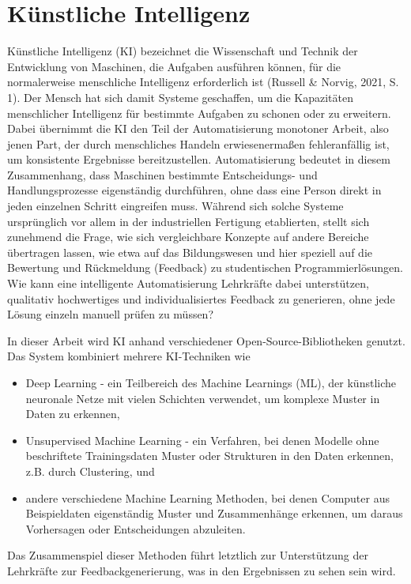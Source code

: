 \section{Künstliche Intelligenz}
Künstliche Intelligenz (KI) bezeichnet die Wissenschaft und Technik der Entwicklung von Maschinen, die Aufgaben ausführen können, für die normalerweise menschliche Intelligenz erforderlich ist (Russell \& Norvig, 2021, S. 1). Der Mensch hat sich damit Systeme geschaffen, um die Kapazitäten menschlicher Intelligenz für bestimmte Aufgaben zu schonen oder zu erweitern. Dabei übernimmt die KI den Teil der Automatisierung monotoner Arbeit, also jenen Part, der durch menschliches Handeln erwiesenermaßen fehleranfällig ist, um konsistente Ergebnisse bereitzustellen. Automatisierung bedeutet in diesem Zusammenhang, dass Maschinen bestimmte Entscheidungs- und Handlungsprozesse eigenständig durchführen, ohne dass eine Person direkt in jeden einzelnen Schritt eingreifen muss. Während sich solche Systeme ursprünglich vor allem in der industriellen Fertigung etablierten, stellt sich zunehmend die Frage, wie sich vergleichbare Konzepte auf andere Bereiche übertragen lassen, wie etwa auf das Bildungswesen und hier speziell auf die Bewertung und Rückmeldung (Feedback) zu studentischen Programmierlösungen. Wie kann eine intelligente Automatisierung Lehrkräfte dabei unterstützen, qualitativ hochwertiges und individualisiertes Feedback zu generieren, ohne jede Lösung einzeln manuell prüfen zu müssen?

In dieser Arbeit wird KI anhand verschiedener Open-Source-Bibliotheken genutzt. Das System kombiniert mehrere KI-Techniken wie
\begin{itemize}
    \item Deep Learning - ein Teilbereich des Machine Learnings (ML), der künstliche neuronale Netze mit vielen Schichten verwendet, um komplexe Muster in Daten zu erkennen,
    \item Unsupervised Machine Learning - ein Verfahren, bei denen Modelle ohne beschriftete Trainingsdaten Muster oder Strukturen in den Daten erkennen, z.B. durch Clustering, und
    \item andere verschiedene Machine Learning Methoden, bei denen Computer aus Beispieldaten eigenständig Muster und Zusammenhänge erkennen, um daraus Vorhersagen oder Entscheidungen abzuleiten.
\end{itemize}
Das Zusammenspiel dieser Methoden führt letztlich zur Unterstützung der Lehrkräfte zur Feedbackgenerierung, was in den Ergebnissen zu sehen sein wird.

